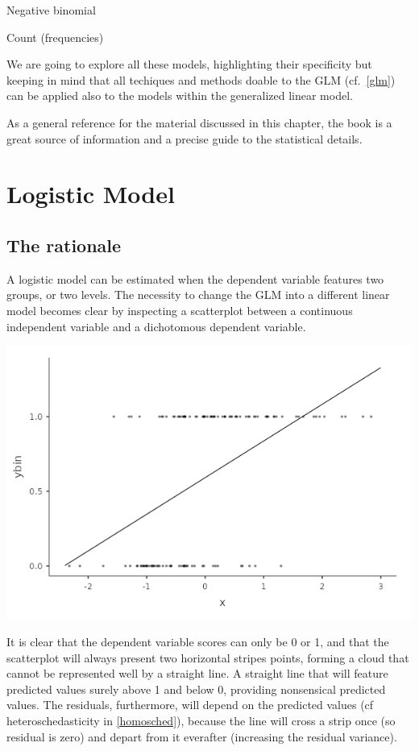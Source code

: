 \documentclass[
]{book}
\begin{document}
Negative binomial

Count (frequencies)

We are going to explore all these models, highlighting their specificity but keeping in mind that all techiques and methods doable to the GLM (cf.~\ref{glm}) can be applied also to the models within the generalized linear model.

As a general reference for the material discussed in this chapter, the book \citet{agresticategorical} is a great source of information and a precise guide to the statistical details.

\hypertarget{logistic}{%
\section{Logistic Model}\label{logistic}}

\hypertarget{the-rationale}{%
\subsection{The rationale}\label{the-rationale}}

A logistic model can be estimated when the dependent variable features two groups, or two levels. The necessity to change the GLM into a different linear model becomes clear by inspecting a scatterplot between a continuous independent variable and a dichotomous dependent variable.

\includegraphics[width=8.38in]{bookletpics/3_logistic_plot1}

It is clear that the dependent variable scores can only be 0 or 1, and that the scatterplot will always present two horizontal stripes points, forming a cloud that cannot be represented well by a straight line. A straight line that will feature predicted values surely above 1 and below 0, providing nonsensical predicted values. The residuals, furthermore, will depend on the predicted values (cf heteroschedasticity in \ref{homosched}), because the line will cross a strip once (so residual is zero) and depart from it everafter (increasing the residual variance).
\end{document}
